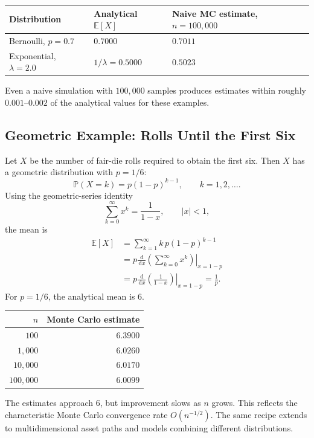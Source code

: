 \documentclass[12pt,openany]{book}
\theoremstyle{definition}
\theoremstyle{remark}
\newcommand{\E}{\mathbb{E}}
\newcommand{\Prob}{\mathbb{P}}
\newcommand{\dd}{\,\mathrm{d}}
\begin{document}
\begin{center}
\small
\begin{tabular}{L{0.30\textwidth}L{0.28\textwidth}L{0.28\textwidth}}
\toprule
\textbf{Distribution} & \textbf{Analytical \(\E[X]\)}
& \textbf{Naive MC estimate, \(n=100{,}000\)}\\
\midrule
Bernoulli, \(p=0.7\) & \(0.7000\) & \(0.7011\)\\
Exponential, \(\lambda=2.0\) & \(1/\lambda=0.5000\) & \(0.5023\)\\
\bottomrule
\end{tabular}
\end{center}

Even a naive simulation with \(100{,}000\) samples produces estimates within
roughly \(0.001\)--\(0.002\) of the analytical values for these examples.

\subsection{Geometric Example: Rolls Until the First Six}

Let \(X\) be the number of fair-die rolls required to obtain the first six.
Then \(X\) has a geometric distribution with \(p=1/6\):
\[
\Prob(X=k)=p(1-p)^{k-1},
\qquad k=1,2,\ldots.
\]
Using the geometric-series identity
\[
\sum_{k=0}^{\infty}x^k=\frac{1}{1-x},
\qquad |x|<1,
\]
the mean is
\[
\begin{aligned}
\E[X]
&=\sum_{k=1}^{\infty}k\,p(1-p)^{k-1}\\
&=p\left.
\frac{\dd}{\dd x}\left(\sum_{k=0}^{\infty}x^k\right)
\right|_{x=1-p}\\
&=p\left.
\frac{\dd}{\dd x}\left(\frac{1}{1-x}\right)
\right|_{x=1-p}
=\frac1p.
\end{aligned}
\]
For \(p=1/6\), the analytical mean is \(6\).

\begin{center}
\begin{tabular}{rr}
\toprule
\(n\) & \textbf{Monte Carlo estimate}\\
\midrule
\(100\) & \(6.3900\)\\
\(1{,}000\) & \(6.0260\)\\
\(10{,}000\) & \(6.0170\)\\
\(100{,}000\) & \(6.0099\)\\
\bottomrule
\end{tabular}
\end{center}

The estimates approach \(6\), but improvement slows as \(n\) grows. This
reflects the characteristic Monte Carlo convergence rate
\(O(n^{-1/2})\). The same recipe extends to multidimensional asset paths and
models combining different distributions.
\end{document}
